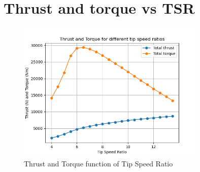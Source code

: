 \section{Thrust and torque vs TSR}
\begin{figure}[H]
    \centering
    \includegraphics[width=0.8\textwidth]{Figures/Thrust_torque_TSR.png}
    \caption{Thrust and Torque function of Tip Speed Ratio}
    \label{fig:thrust and torque function of tip speed ratio}
\end{figure}

